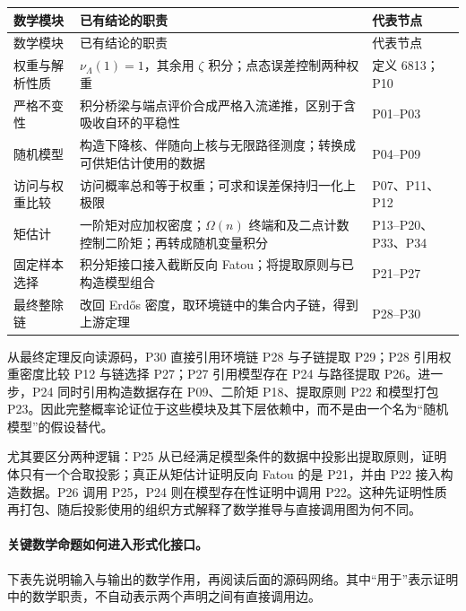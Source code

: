 {\small
\begin{longtable}{@{}p{.21\linewidth}p{.54\linewidth}p{.19\linewidth}@{}}
\toprule
数学模块 & 已有结论的职责 & 代表节点\\\midrule
\endfirsthead
\toprule 数学模块 & 已有结论的职责 & 代表节点\\\midrule
\endhead
权重与解析性质 & $\nu_\Lambda(1)=1$，其余用 $\zeta$ 积分；点态误差控制两种权重 & 定义 6813；P10\\
严格不变性 & 积分桥梁与端点评价合成严格入流递推，区别于含吸收自环的平稳性 & P01--P03\\
随机模型 & 构造下降核、伴随向上核与无限路径测度；转换成可供矩估计使用的数据 & P04--P09\\
访问与权重比较 & 访问概率总和等于权重；可求和误差保持归一化上极限 & P07、P11、P12\\
矩估计 & 一阶矩对应加权密度；$\Omega(n)$ 终端和及二点计数控制二阶矩；再转成随机变量积分 & P13--P20、P33、P34\\
固定样本选择 & 积分矩接口接入截断反向 Fatou；将提取原则与已构造模型组合 & P21--P27\\
最终整除链 & 改回 Erd\H{o}s 密度，取环境链中的集合内子链，得到上游定理 & P28--P30\\
\bottomrule
\end{longtable}}

从最终定理反向读源码，P30 直接引用环境链 P28 与子链提取 P29；P28 引用权重密度比较 P12 与链选择 P27；P27 引用模型存在 P24 与路径提取 P26。进一步，P24 同时引用构造数据存在 P09、二阶矩 P18、提取原则 P22 和模型打包 P23。因此完整概率论证位于这些模块及其下层依赖中，而不是由一个名为“随机模型”的假设替代。

尤其要区分两种逻辑：P25 从已经满足模型条件的数据中投影出提取原则，证明体只有一个合取投影；真正从矩估计证明反向 Fatou 的是 P21，并由 P22 接入构造数据。P26 调用 P25，P24 则在模型存在性证明中调用 P22。这种先证明性质再打包、随后投影使用的组织方式解释了数学推导与直接调用图为何不同。

\paragraph{关键数学命题如何进入形式化接口。}
下表先说明输入与输出的数学作用，再阅读后面的源码网络。其中“用于”表示证明中的数学职责，不自动表示两个声明之间有直接调用边。

